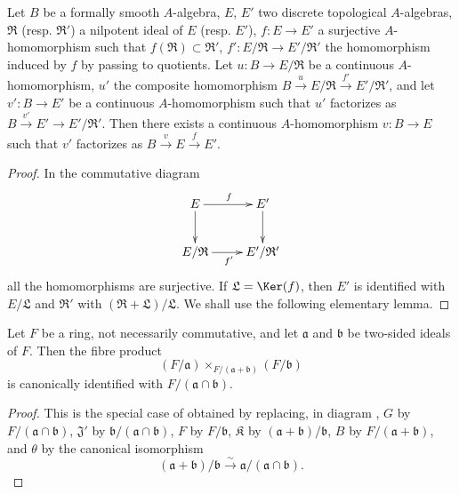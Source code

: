 \begin{lemma}[19.3.10.1]
\label{0.19.3.10.1}
Let $B$ be a formally smooth $A$-algebra, $E$, $E'$ two discrete topological $A$-algebras, $\mathfrak{R}$ (resp. $\mathfrak{R}'$) a nilpotent ideal of $E$ (resp. $E'$), $f:E\to E'$ a surjective $A$-homomorphism such that $f(\mathfrak{R})\subset\mathfrak{R}'$, $f':E/\mathfrak{R}\to E'/\mathfrak{R}'$ the homomorphism induced by $f$ by passing to quotients.
Let $u:B\to E/\mathfrak{R}$ be a continuous $A$-homomorphism, $u'$ the composite homomorphism $B\xrightarrow{u}E/\mathfrak{R}\xrightarrow{f'}E'/\mathfrak{R}'$, and let $v':B\to E'$ be a continuous $A$-homomorphism such that $u'$ factorizes as $B\xrightarrow{v'}E'\to E'/\mathfrak{R}'$.
Then there exists a continuous $A$-homomorphism $v:B\to E$ such that $v'$ factorizes as $B\xrightarrow{v}E\xrightarrow{f}E'$.
\end{lemma}

\begin{proof}
In the commutative diagram
\[
\xymatrix{
  E \ar[r]^f \ar[d] & E' \ar[d] \\
  E/\mathfrak{R} \ar[r]_{f'} & E'/\mathfrak{R}'
}
\]
all the homomorphisms are surjective.
If $\mathfrak{L}=\Ker(f)$, then $E'$ is identified with $E/\mathfrak{L}$ and $\mathfrak{R}'$ with $(\mathfrak{R}+\mathfrak{L})/\mathfrak{L}$.
We shall use the following elementary lemma.
\end{proof}

\begin{lemma}[19.3.10.2]
\label{0.19.3.10.2}
Let $F$ be a ring, not necessarily commutative, and let $\mathfrak{a}$ and $\mathfrak{b}$ be two-sided ideals of $F$.
Then the fibre product
\[
  (F/\mathfrak{a})\times_{F/(\mathfrak{a}+\mathfrak{b})}(F/\mathfrak{b})
\]
is canonically identified with $F/(\mathfrak{a}\cap\mathfrak{b})$.
\end{lemma}

\begin{proof}
This is the special case of  obtained by replacing, in diagram , $G$ by $F/(\mathfrak{a}\cap\mathfrak{b})$, $\mathfrak{J}'$ by $\mathfrak{b}/(\mathfrak{a}\cap\mathfrak{b})$, $F$ by $F/\mathfrak{b}$, $\mathfrak{K}$ by $(\mathfrak{a}+\mathfrak{b})/\mathfrak{b}$, $B$ by $F/(\mathfrak{a}+\mathfrak{b})$, and $\theta$ by the canonical isomorphism
\[
  (\mathfrak{a}+\mathfrak{b})/\mathfrak{b}\xrightarrow{\sim}\mathfrak{a}/(\mathfrak{a}\cap\mathfrak{b}).
\]
\end{proof}


